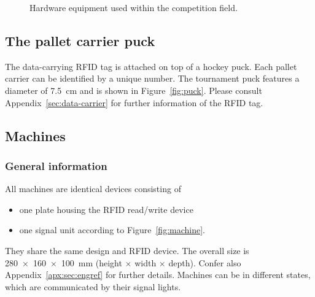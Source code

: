 \documentclass[12pt,twoside]{article}
\begin{document}
\begin{figure}
	\quad\quad
	\caption{Hardware equipment used within the competition field.}
	\label{fig:}
\end{figure}


\subsection{The pallet carrier puck}
The data-carrying RFID tag is attached on top of a hockey puck. Each
pallet carrier can be identified by a unique number. The tournament puck
features a diameter of \SI{7.5}{\centi\metre} and is shown in
Figure~\ref{fig:puck}. Please consult Appendix~\ref{sec:data-carrier} for
further information of the RFID tag.


\subsection{Machines}
\label{sec:machines}

\subsubsection{General information}
All machines are identical devices consisting of 
\begin{itemize}
\item one plate housing the RFID read/write device
\item one signal unit according to Figure~\ref{fig:machine}.
\end{itemize}

They share the same design and RFID device. The overall size is
\SI{280 x 160 x 100}{\milli\metre} (height $\times$ width $\times$
depth). Confer also Appendix~\ref{apx:sec:engref} for further
details. Machines can be in different states, which are communicated by
their signal lights.
\end{document}
